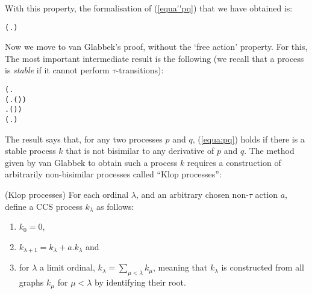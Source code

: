 With this property, the formalisation of (\ref{equa''pq}) that we have
obtained is:
\begin{alltt}
\HOLTokenTurnstile{}   \HOLSymConst{\HOLTokenConj{}}   \HOLSymConst{\HOLTokenImp{}}
   ( \HOLSymConst{\HOLTokenObsCongr}  \HOLSymConst{\HOLTokenEquiv{}} \HOLSymConst{\HOLTokenForall{}}.  \HOLSymConst{+}  \HOLSymConst{\HOLTokenWeakEQ}  \HOLSymConst{+} )
\end{alltt}

Now we move to van Glabbek's proof, without the 
`free action' property. For this, 
 The most important
intermediate result is  the following (we recall that a process is 
\emph{stable} if it cannot perform $\tau$-transitions):
\begin{alltt}
\HOLTokenTurnstile{} (\HOLSymConst{\HOLTokenExists{}}.
          \HOLSymConst{\HOLTokenConj{}} (\HOLSymConst{\HOLTokenForall{}} .  \HOLTokenWeakTransBegin{}\HOLTokenWeakTransEnd {} \HOLSymConst{\HOLTokenImp{}} \HOLSymConst{\HOLTokenNeg{}}( \HOLSymConst{\HOLTokenWeakEQ} )) \HOLSymConst{\HOLTokenConj{}}
        \HOLSymConst{\HOLTokenForall{}} .  \HOLTokenWeakTransBegin{}\HOLTokenWeakTransEnd {} \HOLSymConst{\HOLTokenImp{}} \HOLSymConst{\HOLTokenNeg{}}( \HOLSymConst{\HOLTokenWeakEQ} )) \HOLSymConst{\HOLTokenImp{}}
   (\HOLSymConst{\HOLTokenForall{}}.  \HOLSymConst{+}  \HOLSymConst{\HOLTokenWeakEQ}  \HOLSymConst{+} ) \HOLSymConst{\HOLTokenImp{}}
    \HOLSymConst{\HOLTokenObsCongr} 
\end{alltt}
The result  says that, for any two processes $p$ and $q$,
(\ref{equa:pq}) holds 
 if there is
a stable process $k$ that is not bisimilar to any derivative of
$p$ and $q$. 
 The method given by van Glabbek to obtain such a process $k$  requires a
construction of arbitrarily non-bisimilar processes called ``Klop
processes'':
\begin{definition}{(Klop processes)}
For each ordinal $\lambda$, and an arbitrary chosen non-$\tau$ action $a$,
define a CCS process $k_\lambda$ as follows:
\begin{enumerate}
\item $k_0 = 0$,
\item $k_{\lambda+1} = k_\lambda + a.k_\lambda$ and
\item for $\lambda$ a limit ordinal, $k_\lambda = \sum_{\mu < \lambda}
  k_\mu$, meaning that $k_\lambda$ is constructed from all graphs
  $k_\mu$ for $\mu < \lambda$ by identifying their root.
\end{enumerate}
\end{definition}
